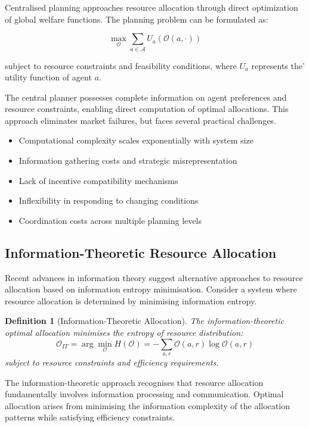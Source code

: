 \documentclass[12pt,a4paper]{article}
\newtheorem{definition}[theorem]{Definition}
\begin{document}
Centralised planning approaches resource allocation through direct optimization of global welfare functions. The planning problem can be formulated as:

\begin{equation}
\max_{\mathcal{O}} \sum_{a \in \mathcal{A}} U_a(\mathcal{O}(a,\cdot))
\end{equation}

subject to resource constraints and feasibility conditions, where $U_a$ represents the' utility function of agent $a$.

The central planner possesses complete information on agent preferences and resource constraints, enabling direct computation of optimal allocations. This approach eliminates market failures, but faces several practical challenges.
\begin{itemize}
\item Computational complexity scales exponentially with system size
\item Information gathering costs and strategic misrepresentation
\item Lack of incentive compatibility mechanisms
\item Inflexibility in responding to changing conditions
\item Coordination costs across multiple planning levels
\end{itemize}

\subsection{Information-Theoretic Resource Allocation}

Recent advances in information theory suggest alternative approaches to resource allocation based on information entropy minimisation. Consider a system where resource allocation is determined by minimising information entropy.

\begin{definition}[Information-Theoretic Allocation]
The information-theoretic optimal allocation minimises the entropy of resource distribution:
\begin{equation}
\mathcal{O}_{IT} = \arg\min_{\mathcal{O}} H(\mathcal{O}) = -\sum_{a,r} \mathcal{O}(a,r) \log \mathcal{O}(a,r)
\end{equation}
subject to resource constraints and efficiency requirements.
\end{definition}

The information-theoretic approach recognises that resource allocation fundamentally involves information processing and communication. Optimal allocation arises from minimising the information complexity of the allocation patterns while satisfying efficiency constraints.
\end{document}

